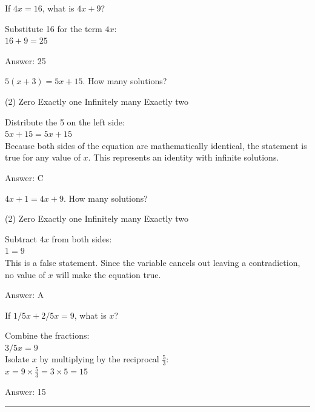 \documentclass[11pt,paper=a4,answers]{exam}
\begin{document}
\begin{questions}
\question
If $4x = 16$, what is $4x + 9$?

\begin{solution}
Substitute 16 for the term $4x$:
\\[10pt]
$16 + 9 = 25$

\vspace{20pt}
Answer: \colorbox{yellow!100}{25}
\end{solution}

\question
$5(x + 3) = 5x + 15$. How many solutions?
\begin{tasks}(2)
    \task Zero
    \task Exactly one
    \task Infinitely many
    \task Exactly two
\end{tasks}

\begin{solution}
Distribute the 5 on the left side:
\\[10pt]
$5x + 15 = 5x + 15$ 
\\[10pt]
Because both sides of the equation are mathematically identical, the statement is true for any value of $x$. This represents an identity with infinite solutions.

\vspace{20pt}
Answer: \colorbox{yellow!100}{C}
\end{solution}

\question
$4x + 1 = 4x + 9$. How many solutions?
\begin{tasks}(2)
    \task Zero
    \task Exactly one
    \task Infinitely many
    \task Exactly two
\end{tasks}

\begin{solution}
Subtract $4x$ from both sides:
\\[10pt]
$1 = 9$ 
\\[10pt]
This is a false statement. Since the variable cancels out leaving a contradiction, no value of $x$ will make the equation true.

\vspace{20pt}
Answer: \colorbox{yellow!100}{A}
\end{solution}

\question
If $1/5 x + 2/5 x = 9$, what is $x$?

\begin{solution}
Combine the fractions:
\\[10pt]
$3/5 x = 9$ 
\\[10pt]
Isolate $x$ by multiplying by the reciprocal $\frac{5}{3}$:
\\[10pt]
$x = 9 \times \frac{5}{3} = 3 \times 5 = 15$

\vspace{20pt}
Answer: \colorbox{yellow!100}{15}
\end{solution}

\end{questions}
\begin{center}
\rule{.5\textwidth}{1pt}
\end{center}
\end{document}

